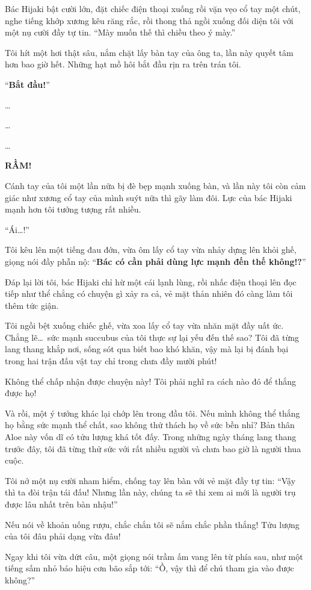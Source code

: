 \documentclass[../main.tex]{subfiles}
\begin{document}
Bác Hijaki bật cười lớn, đặt chiếc điện thoại xuống rồi vặn vẹo cổ tay một chút, nghe tiếng khớp xương kêu răng rắc, rồi thong thả ngồi xuống đối diện tôi với một nụ cười đầy tự tin. ``Mày muốn thế thì chiều theo ý mày.''

Tôi hít một hơi thật sâu, nắm chặt lấy bàn tay của ông ta, lần này quyết tâm hơn bao giờ hết. Những hạt mồ hôi bắt đầu rịn ra trên trán tôi.

``\textbf{Bắt đầu!}''

\dots

\dots

\dots

\textbf{RẦM!}

Cánh tay của tôi một lần nữa bị đè bẹp mạnh xuống bàn, và lần này tôi còn cảm giác như xương cổ tay của mình suýt nữa thì gãy làm đôi. Lực của bác Hijaki mạnh hơn tôi tưởng tượng rất nhiều.

``Ái\dots!''

Tôi kêu lên một tiếng đau đớn, vừa ôm lấy cổ tay vừa nhảy dựng lên khỏi ghế, giọng nói đầy phẫn nộ: ``\textbf{Bác có cần phải dùng lực mạnh đến thế không!?}''

Đáp lại lời tôi, bác Hijaki chỉ hừ một cái lạnh lùng, rồi nhấc điện thoại lên đọc tiếp như thể chẳng có chuyện gì xảy ra cả, vẻ mặt thản nhiên đó càng làm tôi thêm tức giận.

Tôi ngồi bệt xuống chiếc ghế, vừa xoa lấy cổ tay vừa nhăn mặt đầy uất ức. Chẳng lẽ\dots\ sức mạnh succubus của tôi thực sự lại yếu đến thế sao? Tôi đã từng lang thang khắp nơi, sống sót qua biết bao khó khăn, vậy mà lại bị đánh bại trong hai trận đấu vật tay chỉ trong chưa đầy mười phút!

Không thể chấp nhận được chuyện này! Tôi phải nghĩ ra cách nào đó để thắng được họ!

Và rồi, một ý tưởng khác lại chớp lên trong đầu tôi. Nếu mình không thể thắng họ bằng sức mạnh thể chất, sao không thử thách họ về sức bền nhỉ? Bản thân Aloe này vốn dĩ có tửu lượng khá tốt đấy. Trong những ngày tháng lang thang trước đây, tôi đã từng thử sức với rất nhiều người và chưa bao giờ là người thua cuộc.

Tôi nở một nụ cười nham hiểm, chống tay lên bàn với vẻ mặt đầy tự tin: ``Vậy thì ta đòi trận tái đấu! Nhưng lần này, chúng ta sẽ thi xem ai mới là người trụ được lâu nhất trên bàn nhậu!''

Nếu nói về khoản uống rượu, chắc chắn tôi sẽ nắm chắc phần thắng! Tửu lượng của tôi đâu phải dạng vừa đâu!

Ngay khi tôi vừa dứt câu, một giọng nói trầm ấm vang lên từ phía sau, như một tiếng sấm nhỏ báo hiệu cơn bão sắp tới: ``Ồ, vậy thì để chú tham gia vào được không?''
\end{document}
